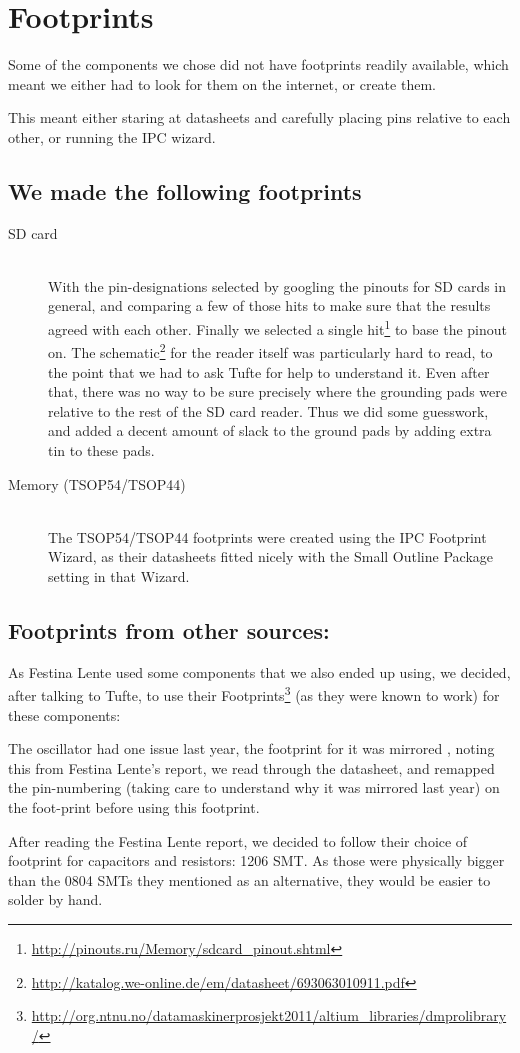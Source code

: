 \section {Footprints}
Some of the components we chose did not have footprints readily available, which
meant we either had to look for them on the internet, or create them.

This meant either staring at datasheets and carefully placing pins
relative to each other, or running the IPC wizard.

\subsection{We made the following footprints}

\begin{description}
\item[SD card] \hfill
\\
  With the pin-designations selected by googling the pinouts for
  \ac{SD} cards in general, and comparing a few of those hits to make sure that
  the results agreed with each other. Finally we selected a single hit\footnote{\url{http://pinouts.ru/Memory/sdcard_pinout.shtml}}
  to base the pinout on. The
  schematic\footnote{\url{http://katalog.we-online.de/em/datasheet/693063010911.pdf}}
  for the reader itself was particularly hard to read, to the point that we had to ask Tufte
  for help to understand it. Even after that, there was no way to be sure
  precisely where the grounding pads were relative to the rest of the \ac{SD}
  card reader. Thus we did some guesswork, and added a decent amount
  of slack to the ground pads by adding extra tin to these pads.
\item[Memory (TSOP54/TSOP44)] \hfill
\\
  The TSOP54/TSOP44 footprints were created using
  the IPC Footprint Wizard, as their datasheets fitted nicely with the Small
  Outline Package setting in that Wizard.
\end{description}

\subsection{Footprints from other sources:}
As Festina Lente used some components that we also ended up using, we decided,
after talking to Tufte, to use their Footprints\footnote{\url{http://org.ntnu.no/datamaskinerprosjekt2011/altium_libraries/dmprolibrary/}}
(as they were known to work) for these components:


The oscillator had one issue last year, the footprint for it was mirrored
, noting this from Festina Lente's report, we read
through the datasheet, and remapped the pin-numbering (taking care to understand
why it was mirrored last year) on the foot-print 
before using this footprint.

After reading the Festina Lente report\cite{berg2011festinalente}, we decided to
follow their choice of footprint for capacitors and resistors: 1206 SMT. As
those were physically bigger than the 0804 SMTs they mentioned as an
alternative, they would be easier to solder by hand.
